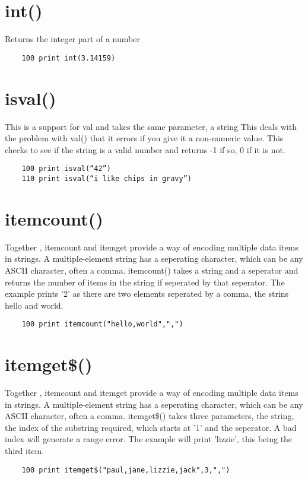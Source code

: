 \section*{int()}
Returns the integer part of a number
\example{}
\begin{verbatim}
	100 print int(3.14159)
\end{verbatim}

\section*{isval()}
This is a support for val and takes the same parameter, a string  This deals with the problem with val() that it errors if you give it a non-numeric value. This checks to see if the string is a valid number  and returns -1 if so, 0 if it is not.
\example{}
\begin{verbatim}
	100 print isval(“42”)
	110 print isval(“i like chips in gravy”)
\end{verbatim}

\section*{itemcount()}
Together , itemcount and itemget provide a way of encoding multiple data items in strings. A multiple-element string has a seperating character, which can be any ASCII character, often a comma. 
itemcount() takes a string and a seperator and returns the number of items in the string if seperated by that seperator. The example prints '2' as there are two elements seperated by a comma, the strins hello and world.
\example{}
\begin{verbatim}
	100 print itemcount("hello,world",",")
\end{verbatim}

\section*{itemget\$()}
Together , itemcount and itemget provide a way of encoding multiple data items in strings. A multiple-element string has a seperating character, which can be any ASCII character, often a comma.  itemget\$() takes three parameters, the string, the index of the substring required, which starts at '1' and the seperator. A bad index will generate a range error.
The example will print 'lizzie', this being the third item.
\example{}
\begin{verbatim}
	100 print itemget$("paul,jane,lizzie,jack",3,",")
\end{verbatim}


